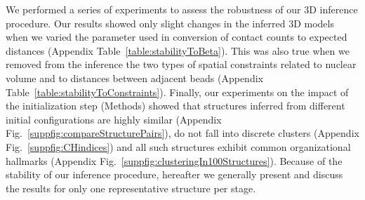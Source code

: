 We performed a series of experiments to assess the robustness of our 3D
inference procedure.  Our results showed only slight changes in the inferred
3D models when we varied the parameter used in conversion of contact counts to
expected distances (Appendix Table~\ref{table:stabilityToBeta}). This
was also true when we removed from the inference the two types of spatial
constraints related to nuclear volume and to distances between adjacent beads
(Appendix Table~\ref{table:stabilityToConstraints}). Finally, our
experiments on the impact of the initialization step (Methods) showed that
structures inferred from different initial configurations are highly similar
(Appendix Fig.~\ref{suppfig:compareStructurePairs}), do not fall into
discrete clusters (Appendix Fig.~\ref{suppfig:CHindices}) and all such
structures exhibit common organizational hallmarks (Appendix
Fig.~\ref{suppfig:clusteringIn100Structures}). Because of the stability of
our inference procedure, hereafter we generally present and discuss the
results for only one representative structure per stage.

